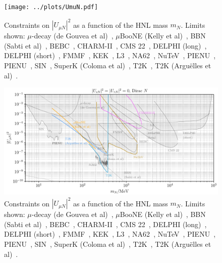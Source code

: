 \documentclass{revtex4-2}%
\begin{document}
%


\begin{figure}[h!]%
\centering%
\texttt{[image: ../plots/UmuN.pdf]}%
\caption{Constraints on $|U_{\mu N}|^2$ as a function of the HNL mass $m_N$. Limits shown: $\mu$-decay (de Gouvea et al)~\cite{deGouvea:2015euy}, $\mu$BooNE (Kelly et al)~\cite{Kelly:2021xbv}, BBN (Sabti et al)~\cite{Sabti:2020yrt}, BEBC~\cite{WA66:1985mfx}, CHARM-II~\cite{CHARMII:1994jjr}, CMS 22~\cite{2201.05578}, DELPHI (long)~\cite{DELPHI:1996qcc}, DELPHI (short)~\cite{DELPHI:1996qcc}, FMMF~\cite{FMMF:1994yvb,}, KEK~\cite{Asano:1981he,}, L3~\cite{None}, NA62~\cite{NA62:2021bji}, NuTeV~\cite{NuTeV:1999kej}, PIENU~\cite{PIENU:2019usb}, PIENU~\cite{PIENU:2019usb}, SIN~\cite{Daum:1987bg}, SuperK (Coloma et al)~\cite{Coloma:2019htx}, T2K~\cite{T2K:2019jwa}, T2K (Argu\"elles et al)~\cite{Arguelles:2021dqn}.}%
\end{figure}

%


\begin{figure}[h!]%
\centering%
\includegraphics[width=1\textwidth]{../plots/UmuN_nf03.pdf}%
\caption{Constraints on $|U_{\mu N}|^2$ as a function of the HNL mass $m_N$. Limits shown: $\mu$-decay (de Gouvea et al)~\cite{deGouvea:2015euy}, $\mu$BooNE (Kelly et al)~\cite{Kelly:2021xbv}, BBN (Sabti et al)~\cite{Sabti:2020yrt}, BEBC~\cite{WA66:1985mfx}, CHARM-II~\cite{CHARMII:1994jjr}, CMS 22~\cite{2201.05578}, DELPHI (long)~\cite{DELPHI:1996qcc}, DELPHI (short)~\cite{DELPHI:1996qcc}, FMMF~\cite{FMMF:1994yvb,}, KEK~\cite{Asano:1981he,}, L3~\cite{None}, NA62~\cite{NA62:2021bji}, NuTeV~\cite{NuTeV:1999kej}, PIENU~\cite{PIENU:2019usb}, PIENU~\cite{PIENU:2019usb}, SIN~\cite{Daum:1987bg}, SuperK (Coloma et al)~\cite{Coloma:2019htx}, T2K~\cite{T2K:2019jwa}, T2K (Argu\"elles et al)~\cite{Arguelles:2021dqn}.}%
\end{figure}
\end{document}
